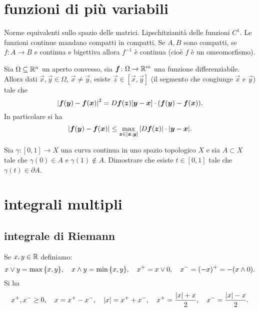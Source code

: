 \chapter{funzioni di più variabili}

Norme equivalenti sullo spazio delle matrici. Lipschitzianità delle funzioni $C^1$.
Le funzioni continue mandano compatti in compatti.
Se $A,B$ sono compatti, se $f\colon A\to B$ e continua e bigettiva allora 
$f^{-1}$ è continua (cioè $f$ è un omeomorfismo).


\begin{theorem}
  \label{th:lagrange}
Sia $\Omega\subseteq {\mathbb R}^n$ un aperto convesso, 
sia $\boldsymbol f\colon \Omega\to {\mathbb R}^m$ una funzione differenziabile.
Allora dati $\vec x,\vec y \in \Omega$, $\vec x\neq \vec y$, 
esiste $\vec z \in [\vec x,\vec y]$ (il segmento che congiunge $\vec x$ e $\vec y$)
tale che 
\[
 {\left|\boldsymbol f(\boldsymbol y)- \boldsymbol f(\boldsymbol x)\right|}^2
 =  D\boldsymbol f(\boldsymbol z)[\boldsymbol y-\boldsymbol x]\cdot (\boldsymbol f(\boldsymbol y)-\boldsymbol f(\boldsymbol x)).
\]
In particolare si ha 
\[
{\left|\boldsymbol f(\boldsymbol y)- \boldsymbol f(\boldsymbol x)\right|}
\le \max_{\boldsymbol z\in [\boldsymbol x,\boldsymbol y]} {\left|D\boldsymbol f(\boldsymbol z)\right|} \cdot {\left|\boldsymbol y-\boldsymbol x\right|}.
\]
\end{theorem}

\begin{exercise}
  \label{ex:punto-di-frontiera}
Sia $\gamma\colon [0,1] \to X$ una curva continua in uno 
spazio topologico $X$ e sia $A\subset X$ tale che 
$\gamma(0)\in A$ e $\gamma(1)\notin A$.
Dimostrare che esiste $t \in [0,1]$ tale che $\gamma(t) \in \partial A$.
\end{exercise}

\chapter{integrali multipli}

\section{integrale di Riemann}
Se $x,y\in {\mathbb R}$ definiamo:
\[
    x \vee y = \max{\left\{ x,y \right\}},
    \quad
    x \wedge y = \min{\left\{ x,y \right\}},
    \quad
    x^+ = x \vee 0,
    \quad
    x^- = (-x)^+ = -(x\wedge 0).
\]
Si ha
\[
    x^+,x^-\ge 0,
    \quad
    x = x^+ - x^-,
    \quad 
    {\left|x\right|} = x^+ + x^-,
    \quad
    x^+ = \frac{{\left|x\right|}+x}{2},
    \quad
    x^- = \frac{{\left|x\right|}-x}{2}.
\]

